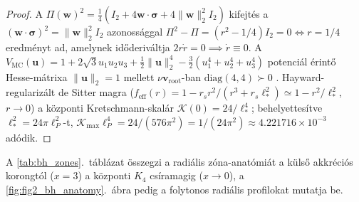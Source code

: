 \documentclass[11pt,a4paper]{article}
\theoremstyle{remark}
\begin{document}
\begin{proof}
A $\Pi(\mathbf{w})^2 = \frac{1}{4}(I_2 + 4\mathbf{w}\cdot\boldsymbol{\sigma} + 4\|\mathbf{w}\|_2^2 I_2)$ kifejt\'es a $(\mathbf{w}\cdot\boldsymbol{\sigma})^2 = \|\mathbf{w}\|_2^2 I_2$ azonoss\'aggal $\Pi^2 - \Pi = (r^2 - 1/4)I_2 = 0 \iff r = 1/4$ eredm\'enyt ad, amelynek id\H{o}deriv\'altja $2r\dot{r} = 0 \implies \dot{r} \equiv 0$. A $V_{\mathrm{MC}}(\mathbf{u}) = 1 + 2\sqrt{3}u_1 u_2 u_3 + \frac{1}{2}\|\mathbf{u}\|_2^4 - \frac{3}{2}(u_1^4+u_2^4+u_3^4)$ potenci\'al \'erint\H{o} Hesse-m\'atrixa $\|\mathbf{u}\|_2 = 1$ mellett $\nu\mathbf{v}_{\mathrm{root}}$-ban $\mathrm{diag}(4, 4) \succ 0$ \cite{JolcsakTauFoundationSeries2026}. Hayward-regulariz\'alt de Sitter magra ($f_{\mathrm{eff}}(r) = 1 - r_s r^2/(r^3 + r_s \ell_*^2) \simeq 1 - r^2/\ell_*^2$, $r \to 0$) a k\"ozponti Kretschmann-skal\'ar $\mathcal{K}(0) = 24/\ell_*^4$; behelyettes\'itve $\ell_*^2 = 24\pi\ell_P^2$-t, $\mathcal{K}_{\max}\ell_P^4 = 24/(576\pi^2) = 1/(24\pi^2) \approx 4.221716 \times 10^{-3}$ ad\'odik.
\end{proof}

A \ref{tab:bh_zones}.\ t\'abl\'azat \"osszegzi a radi\'alis z\'ona-anat\'omi\'at a k\"uls\H{o} akkr\'eci\'os korongt\'ol ($x = 3$) a k\"ozponti $K_4$ cs\'iramagig ($x \to 0$), a \ref{fig:fig2_bh_anatomy}.\ \'abra pedig a folytonos radi\'alis profilokat mutatja be.
\end{document}
